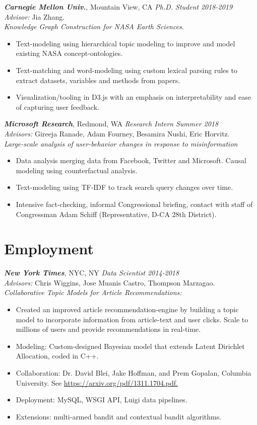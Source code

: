 \documentclass[margin]{res}
\begin{document}
\begin{resume}
{\sl \bf Carnegie Mellon Univ.}, Mountain View, CA {\sl Ph.D. Student} \hfill {\it 2018-2019}\\
\textit{Advisor:} Jia Zhang.\\
\textit{Knowledge Graph Construction for NASA Earth Sciences}.
\begin{itemize}
	\item Text-modeling using hierarchical topic modeling to improve and model existing NASA concept-ontologies.
	\item Text-matching and word-modeling using custom lexical parsing rules to extract datasets, variables and methods from papers.
	\item Visualization/tooling in D3.js with an emphasis on interpretability and ease of capturing user feedback.
\end{itemize}

{\sl \bf Microsoft Research}, Redmond, WA {\sl Research Intern} \hfill {\it Summer 2018}\\
\textit{Advisors:} Gireeja Ranade, Adam Fourney, Besamira Nushi, Eric Horvitz.\\
\textit{Large-scale analysis of user-behavior changes in response to misinformation}\\
\begin{itemize}
	\item Data analysis merging data from Facebook, Twitter and Microsoft. Causal modeling using counterfactual analysis.
	\item Text-modeling using TF-IDF to track search query changes over time.
	\item Intensive fact-checking, informal Congressional briefing, contact with staff of Congressman Adam Schiff (Representative, D-CA 28th District).
\end{itemize}


\section{Employment}
{\sl \bf New York Times}, NYC, NY {\sl Data Scientist} \hfill {\it 2014-2018}\\
\textit{Advisors:} Chris Wiggins, Jose Muanis Castro, Thompson Marzagao.\\
\textit{Collaborative Topic Models for Article Recommendations:} 
\begin{itemize}
	\item Created an improved article recommendation-engine by building a topic model to incorporate information from article-text and user clicks. Scale to millions of users and provide recommendations in real-time.
	\item Modeling: Custom-designed Bayesian model that extends Latent Dirichlet Allocation, coded in C++.
	\item Collaboration: Dr. David Blei, Jake Hoffman, and Prem Gopalan, Columbia University. See \url{https://arxiv.org/pdf/1311.1704.pdf.}
	\item Deployment: MySQL, WSGI API, Luigi data pipelines.
	\item Extensions: multi-armed bandit and contextual bandit algorithms.	
\end{itemize}


\end{resume}
\end{document}
